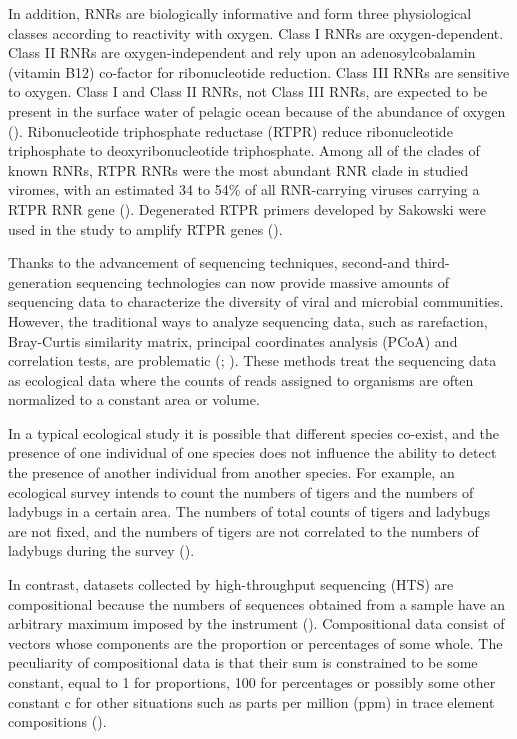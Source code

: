 \documentclass[a4,center,fleqn]{NAR}
\begin{document}
In addition, RNRs are biologically informative and form three physiological classes according to reactivity with oxygen. 
Class I RNRs are oxygen-dependent. 
Class II RNRs are oxygen-independent and rely upon an adenosylcobalamin (vitamin B12) co-factor for ribonucleotide reduction. 
Class III RNRs are sensitive to oxygen. 
Class I and Class II RNRs, not Class III RNRs, are expected to be present in the surface water of pelagic ocean because of the abundance of oxygen (\cite{Nordlund2006}). 
Ribonucleotide triphosphate reductase (RTPR) reduce ribonucleotide triphosphate to deoxyribonucleotide triphosphate.
Among all of the clades of known RNRs, RTPR RNRs were the most abundant RNR clade in studied viromes, with an estimated 34 to 54\% of all RNR-carrying viruses carrying a RTPR RNR gene (\cite{Sakowski2014}). 
Degenerated RTPR primers developed by Sakowski were used in the study to amplify RTPR genes (\cite{Sakowski2014}).

Thanks to the advancement of sequencing techniques, second-and third- generation sequencing technologies can now provide massive amounts of sequencing data to characterize the diversity of viral and microbial communities. 
However, the traditional ways to analyze sequencing data, such as rarefaction, Bray-Curtis similarity matrix,  principal coordinates analysis (PCoA) and correlation tests, are problematic (\cite{McMurdie2014}; \cite{Weiss:2017aa}). 
These methods treat the sequencing data as ecological data where the counts of reads assigned to organisms are often normalized to a constant area or volume. 

In a typical ecological study it is possible that different species co-exist, and the presence of one individual of one species does not influence the ability to detect the presence of another individual from another species. 
For example, an ecological survey intends to count the numbers of tigers and the numbers of ladybugs in a certain area. 
The numbers of total counts of tigers and ladybugs are not fixed, and the numbers of tigers are not correlated to the numbers of ladybugs during the survey (\cite{Gloor2017}). 

In contrast, datasets collected by high-throughput sequencing (HTS) are compositional because the numbers of sequences obtained from a sample have an arbitrary maximum imposed by the instrument (\cite{Gloor2017}). 
Compositional data consist of vectors whose components are the proportion or percentages of some whole. 
The peculiarity of compositional data is that their sum is constrained to be some constant, equal to 1 for proportions, 100 for percentages or possibly some other constant c for other situations such as parts per million (ppm) in trace element compositions (\cite{10.2307/2345821}). 
\end{document}
